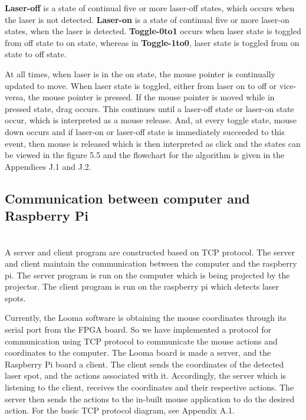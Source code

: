 \documentclass[12pt, a4paper]{article}
\begin{document}
	\textbf {Laser-off} is a state of continual five or more laser-off  states, which occurs when the laser is not detected. \textbf{Laser-on} is a state of continual five or more laser-on states, when the laser is detected. \textbf{Toggle-0to1} occurs when laser state is toggled from off state to on state, whereas in \textbf{Toggle-1to0}, laser state is toggled from on state to off state. 
	
	At all times, when laser is in the on state, the mouse pointer is continually updated to move. When laser state is toggled, either from laser on to off or vice-versa, the mouse pointer is pressed. If the mouse pointer is moved while in pressed state, drag occurs. This continues until a laser-off state or laser-on state occur, which is interpreted as a mouse release. And, at every toggle state, mouse down occurs and if laser-on or laser-off state is immediately succeeded to this event, then mouse is released which is then interpreted as click and the states can be viewed in the figure 5.5 and the flowchart for the algorithm is given in the Appendices J.1 and J.2.
\newpage


\subsection{Communication between computer and Raspberry Pi}
~\\
	A server and client program are constructed based on TCP protocol. The server and client maintain the communication between the computer and the raspberry pi. The server program is run on the computer which is being projected by the projector. The client program is run on the raspberry pi which detects laser spots. 
	
	Currently, the Looma software is obtaining the mouse coordinates through its serial port from the FPGA board. So we have implemented a protocol for communication using TCP protocol to communicate the mouse actions and coordinates to the computer. The Looma board is made a server, and the Raspberry Pi board a client. The client sends the coordinates of the detected laser spot, and the actions associated with it. Accordingly, the server which is listening to the client, receives the coordinates and their respective actions. The server then sends the actions to the in-built mouse application to do the desired action.  For the basic TCP protocol diagram, see Appendix A.1.
\end{document}
